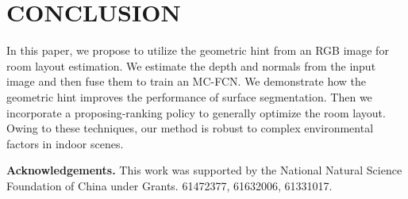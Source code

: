 \section{CONCLUSION}
\label{sec:Con}

In this paper, we propose to utilize the geometric hint from an RGB image for room layout estimation. We estimate the depth and normals from the input image and then fuse them to train an MC-FCN. We demonstrate how the geometric hint improves the performance of surface segmentation. Then we incorporate a proposing-ranking policy to generally optimize the room layout. Owing to these techniques, our method is robust to complex environmental factors in indoor scenes.


\noindent\textbf{Acknowledgements.} This work was supported by the National Natural Science Foundation of China under Grants. 61472377, 61632006, 61331017.